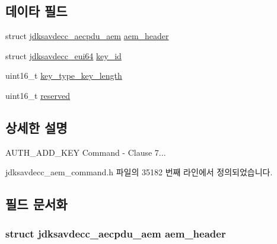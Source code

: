 \subsection*{데이타 필드}
\begin{DoxyCompactItemize}
\item 
struct \hyperlink{structjdksavdecc__aecpdu__aem}{jdksavdecc\+\_\+aecpdu\+\_\+aem} \hyperlink{structjdksavdecc__aem__command__auth__add__key_ae1e77ccb75ff5021ad923221eab38294}{aem\+\_\+header}
\item 
struct \hyperlink{structjdksavdecc__eui64}{jdksavdecc\+\_\+eui64} \hyperlink{structjdksavdecc__aem__command__auth__add__key_a37cbdf6056556ccfaee3ab01dc7c3032}{key\+\_\+id}
\item 
uint16\+\_\+t \hyperlink{structjdksavdecc__aem__command__auth__add__key_aa4ab2c8fde3f5a7c664d627933272a14}{key\+\_\+type\+\_\+key\+\_\+length}
\item 
uint16\+\_\+t \hyperlink{structjdksavdecc__aem__command__auth__add__key_a5a6ed8c04a3db86066924b1a1bf4dad3}{reserved}
\end{DoxyCompactItemize}


\subsection{상세한 설명}
A\+U\+T\+H\+\_\+\+A\+D\+D\+\_\+\+K\+EY Command -\/ Clause 7... 

jdksavdecc\+\_\+aem\+\_\+command.\+h 파일의 35182 번째 라인에서 정의되었습니다.



\subsection{필드 문서화}
\subsubsection[{\texorpdfstring{aem\+\_\+header}{aem_header}}]{\setlength{\rightskip}{0pt plus 5cm}struct {\bf jdksavdecc\+\_\+aecpdu\+\_\+aem} aem\+\_\+header}\hypertarget{structjdksavdecc__aem__command__auth__add__key_ae1e77ccb75ff5021ad923221eab38294}{}\label{structjdksavdecc__aem__command__auth__add__key_ae1e77ccb75ff5021ad923221eab38294}


